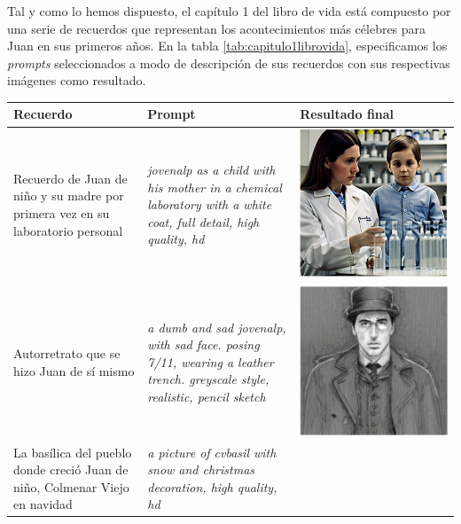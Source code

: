 Tal y como lo hemos dispuesto, el capítulo 1 del libro de vida está compuesto por una serie de recuerdos que representan los acontecimientos más célebres para Juan en sus primeros años. En la tabla \ref*{tab:capitulo1librovida}, especificamos los \textit{prompts} seleccionados a modo de descripción de sus recuerdos con sus respectivas imágenes como resultado. \\
 
 \begin{table}
 	\centering
 	\begin{tabular}{>{\centering\arraybackslash}m{5cm} >{\arraybackslash}m{5cm}>{\arraybackslash}m{5cm}}
 		\textbf{Recuerdo} & \textbf{Prompt} & \textbf{Resultado final} \\
 		\hline
 		Recuerdo de Juan de niño y su madre por primera vez en su laboratorio personal & \textit{jovenalp as a child with his mother in a chemical laboratory with a white coat, full detail, high quality, hd} & \includegraphics[width = 0.3
 		\textwidth]{Imagenes/Vectorial/alpysumadrelab.png}\\
 		\hline
 		Autorretrato que se hizo Juan de sí mismo &\textit{a dumb and sad jovenalp, with sad face. posing 7/11, wearing a leather trench. greyscale style, realistic, pencil sketch} & \includegraphics[width = 0.3
 		\textwidth]{Imagenes/Vectorial/autoretratoalp.png}\\
 		\hline
 		La basílica del pueblo donde creció Juan de niño, Colmenar Viejo en navidad & \textit{a picture of cvbasil with snow and christmas decoration, high quality, hd} & \includegraphics[width = 0.3

\end{tabular}
\end{table}

